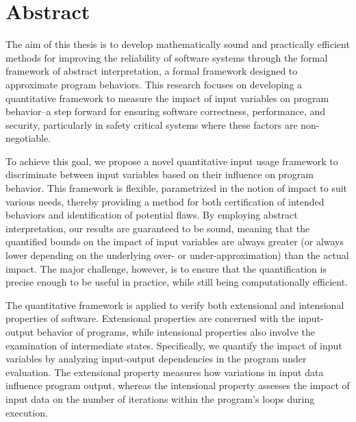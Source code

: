 
\chapter*{Abstract}


The aim of this thesis is to develop mathematically sound and practically efficient methods for improving the reliability of software systems through the formal framework of abstract interpretation, a formal framework designed to approximate program behaviors. This research focuses on developing a quantitative framework to measure the impact of input variables on program behavior--a step forward for ensuring software correctness, performance, and security, particularly in safety critical systems where these factors are non-negotiable.


To achieve this goal, we propose a novel quantitative input usage framework to discriminate between input variables based on their influence on program behavior.
This framework is flexible, parametrized in the notion of impact to suit various needs, thereby providing a method for both certification of intended behaviors and identification of potential flaws.
By employing abstract interpretation, our results are guaranteed to be sound, meaning that the quantified bounds on the impact of input variables are always greater (or always lower depending on the underlying over- or under-approximation) than the actual impact.
The major challenge, however, is to ensure that the quantification is precise enough to be useful in practice, while still being computationally efficient.


The quantitative framework is applied to verify both extensional and intensional properties of software. Extensional properties are concerned with the input-output behavior of programs, while intensional properties also involve the examination of intermediate states. Specifically, we quantify the impact of input variables by analyzing input-output dependencies in the program under evaluation. The extensional property measures how variations in input data influence program output, whereas the intensional property assesses the impact of input data on the number of iterations within the program’s loops during execution.

